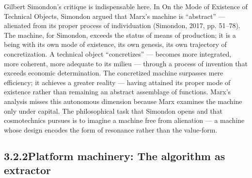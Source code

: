 Gilbert Simondon’s critique is indispensable here. In On the Mode of Existence of Technical Objects, Simondon argued that Marx’s machine is “abstract” — alienated from its proper process of individuation (Simondon, 2017, pp. 51–78). The machine, for Simondon, exceeds the status of means of production; it is a being with its own mode of existence, its own genesis, its own trajectory of concretization. A technical object “concretizes” — becomes more integrated, more coherent, more adequate to its milieu — through a process of invention that exceeds economic determination. The concretized machine surpasses mere efficiency; it achieves a greater reality — having attained its proper mode of existence rather than remaining an abstract assemblage of functions. Marx’s analysis misses this autonomous dimension because Marx examines the machine only under capital. The philosophical task that Simondon opens and that cosmotechnics pursues is to imagine a machine free from alienation — a machine whose design encodes the form of resonance rather than the value-form.

\subsection{3.2.2\quad Platform machinery: The algorithm as extractor}

